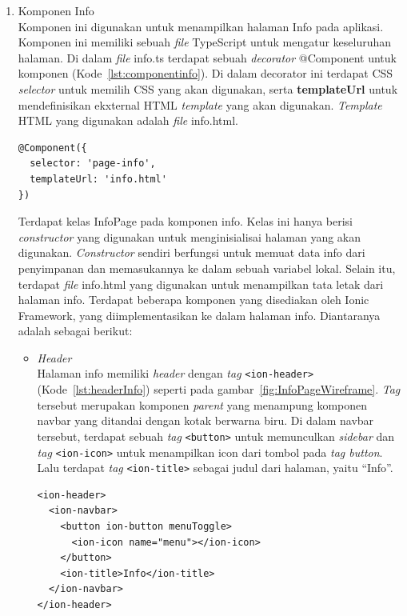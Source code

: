\begin{enumerate}
	\item Komponen Info \\
	Komponen ini digunakan untuk menampilkan halaman Info pada aplikasi. Komponen ini memiliki sebuah \textit{file} TypeScript untuk mengatur keseluruhan halaman. Di dalam \textit{file} info.ts terdapat sebuah \textit{decorator} @Component untuk komponen (Kode~\ref{lst:componentinfo}). Di dalam decorator ini terdapat CSS \textit{selector} untuk memilih CSS yang akan digunakan, serta \textbf{templateUrl} untuk mendefinisikan ekxternal HTML \textit{template} yang akan digunakan. \textit{Template} HTML yang digunakan adalah \textit{file} info.html. 
	
\begin{lstlisting}[label={lst:componentinfo}, caption=@Component pada info.ts]
@Component({
  selector: 'page-info',
  templateUrl: 'info.html'
})
\end{lstlisting} 

	Terdapat kelas InfoPage pada komponen info. Kelas ini hanya berisi \textit{constructor} yang digunakan untuk menginisialisai halaman yang akan digunakan. \textit{Constructor} sendiri berfungsi untuk memuat data info dari penyimpanan dan memasukannya ke dalam sebuah variabel lokal.
	Selain itu, terdapat \textit{file} info.html yang digunakan untuk menampilkan tata letak dari halaman info. Terdapat beberapa komponen yang disediakan oleh Ionic Framework, yang diimplementasikan ke dalam halaman info. Diantaranya adalah sebagai berikut:
	
	\begin{itemize}
		\item \textit{Header} \\
		Halaman info memiliki \textit{header} dengan \textit{tag} \texttt{<ion-header>} (Kode~\ref{lst:headerInfo}) seperti pada gambar~\ref{fig:InfoPageWireframe}. \textit{Tag} tersebut merupakan komponen \textit{parent} yang menampung komponen navbar yang ditandai dengan kotak berwarna biru. Di dalam navbar tersebut, terdapat sebuah \textit{tag} \texttt{<button>} untuk memunculkan \textit{sidebar} dan \textit{tag} \texttt{<ion-icon>} untuk menampilkan icon dari tombol pada \textit{tag button}. Lalu terdapat \textit{tag} \texttt{<ion-title>} sebagai judul dari halaman, yaitu ``Info''.
	
\begin{lstlisting}[label={lst:headerInfo}, caption=\textit{Header} pada info.html]
<ion-header>
  <ion-navbar>
    <button ion-button menuToggle>
      <ion-icon name="menu"></ion-icon>
    </button>
    <ion-title>Info</ion-title>
  </ion-navbar>
</ion-header>
\end{lstlisting} 


\end{itemize}
\end{enumerate}
